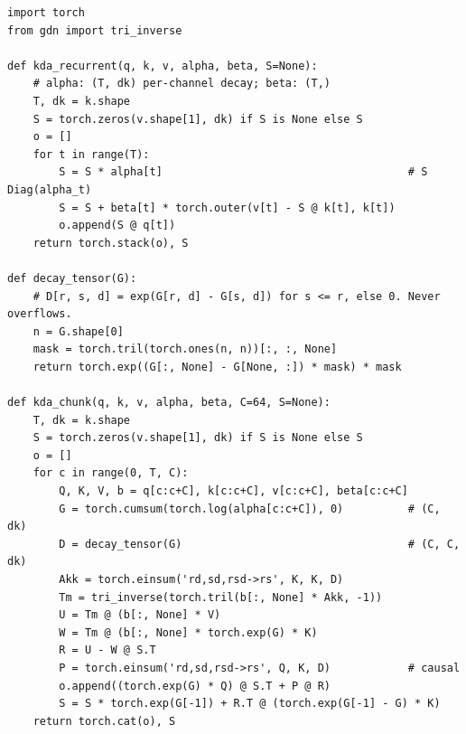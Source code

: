 \begin{lstlisting}[caption={Reference implementation (ours): KDA, recurrent and chunkwise},label={lst:c05-ours-kda}]
import torch
from gdn import tri_inverse

def kda_recurrent(q, k, v, alpha, beta, S=None):
    # alpha: (T, dk) per-channel decay; beta: (T,)
    T, dk = k.shape
    S = torch.zeros(v.shape[1], dk) if S is None else S
    o = []
    for t in range(T):
        S = S * alpha[t]                                      # S Diag(alpha_t)
        S = S + beta[t] * torch.outer(v[t] - S @ k[t], k[t])
        o.append(S @ q[t])
    return torch.stack(o), S

def decay_tensor(G):
    # D[r, s, d] = exp(G[r, d] - G[s, d]) for s <= r, else 0. Never overflows.
    n = G.shape[0]
    mask = torch.tril(torch.ones(n, n))[:, :, None]
    return torch.exp((G[:, None] - G[None, :]) * mask) * mask

def kda_chunk(q, k, v, alpha, beta, C=64, S=None):
    T, dk = k.shape
    S = torch.zeros(v.shape[1], dk) if S is None else S
    o = []
    for c in range(0, T, C):
        Q, K, V, b = q[c:c+C], k[c:c+C], v[c:c+C], beta[c:c+C]
        G = torch.cumsum(torch.log(alpha[c:c+C]), 0)          # (C, dk)
        D = decay_tensor(G)                                   # (C, C, dk)
        Akk = torch.einsum('rd,sd,rsd->rs', K, K, D)
        Tm = tri_inverse(torch.tril(b[:, None] * Akk, -1))
        U = Tm @ (b[:, None] * V)
        W = Tm @ (b[:, None] * torch.exp(G) * K)
        R = U - W @ S.T
        P = torch.einsum('rd,sd,rsd->rs', Q, K, D)            # causal
        o.append((torch.exp(G) * Q) @ S.T + P @ R)
        S = S * torch.exp(G[-1]) + R.T @ (torch.exp(G[-1] - G) * K)
    return torch.cat(o), S
\end{lstlisting}

